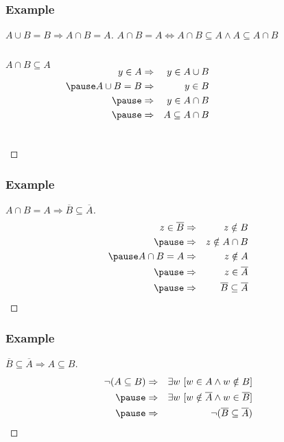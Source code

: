 \documentclass[dvipsnames]{beamer}
\begin{document}
\begin{frame}
  \frametitle{Example}

  \begin{proof}[$A \cup B = B \Rightarrow A \cap B = A$]
    $A \cap B = A \Leftrightarrow
      A \cap B \subseteq A \wedge A \subseteq A \cap B$

    \pause
    \bigskip
    \begin{columns}
      $A \cap B \subseteq A$

      \pause
      \medskip
      \begin{eqnarray*}
        y \in A      & \Rightarrow & y \in A \cup B\\\pause
        A \cup B = B & \Rightarrow & y \in B\\\pause
                     & \Rightarrow & y \in A \cap B\\\pause
                     & \Rightarrow & A \subseteq A \cap B
      \end{eqnarray*}
    \end{columns}
  \end{proof}
\end{frame}

\begin{frame}
  \frametitle{Example}

  \begin{proof}[$A \cap B = A \Rightarrow \overline{B} \subseteq \overline{A}$]
    \begin{eqnarray*}
      z \in \overline{B} & \Rightarrow & z \notin B\\\pause
                         & \Rightarrow & z \notin A \cap B\\\pause
      A \cap B = A       & \Rightarrow & z \notin A\\\pause
                         & \Rightarrow & z \in \overline{A}\\\pause
                         & \Rightarrow & \overline{B} \subseteq \overline{A}
    \end{eqnarray*}
  \end{proof}
\end{frame}

\begin{frame}
  \frametitle{Example}

  \begin{proof}[$\overline{B} \subseteq \overline{A} \Rightarrow A \subseteq B$]
    \begin{eqnarray*}
      \neg(A \subseteq B)
        & \Rightarrow & \exists w~[w \in A \wedge w \notin B]\\\pause
        & \Rightarrow & \exists w~[w \notin \overline{A} \wedge w \in \overline{B}]\\\pause
        & \Rightarrow & \neg(\overline{B} \subseteq \overline{A})
    \end{eqnarray*}
  \end{proof}
\end{frame}
\end{document}
